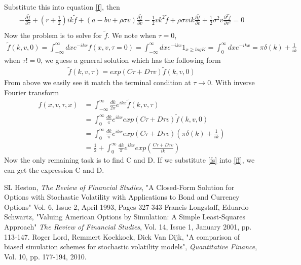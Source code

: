 \documentclass[a4paper]{article}
\begin{document}
Substitute this into equation \ref{f}, then
\begin{align} \label{ff}
	-\frac{\partial \tilde f}{\partial \tau}
	+ (r + \frac{1}{2})ik \tilde f 
	+ (a-bv+\rho \sigma v)\frac{\partial \tilde f}{\partial v}
        -\frac{1}{2}vk^2 \tilde f 
	+ \rho \sigma v ik \frac{\partial \tilde f}{\partial v}
        +\frac{1}{2} \sigma^2 v \frac{\partial^2 \tilde f}{\partial v^2}  = 0\\
\end{align}
Now the problem is to solve for $\tilde f$. We note when $\tau=0$,
\begin{align*}
	\tilde f(k, v, 0) = \int_{-\infty}^{\infty}dx e^{-ikx}f(x, v, \tau=0)
			  = \int_{-\infty}^{\infty}dx e^{-ikx}1_{x \geq logK}
			     = \int_{0}^{\infty}dx e^{-ikx}
			     = \pi \delta(k) + \frac{1}{ik}
\end{align*}
when $\tau!=0$, we guess a general solution which has the following form
\begin{align*}
	\tilde f(k, v, \tau) = exp(C\tau +D\tau v) \tilde f(k,v,0)
\end{align*}
From above we easily see it match the terminal condition at $\tau \to 0$. With inverse Fourier transform
\begin{align} \label{fs}
	f(x, v, \tau, x) & = \int_{-\infty}^{\infty}\frac{dk}{2\pi} e^{ikx} \tilde f(k, v, \tau)\\
			 & = \int_{0}^{\infty}\frac{dk}{\pi} e^{ikx} exp(C\tau + D\tau v) \tilde f(k, v, 0)\\
			 & = \int_{0}^{\infty}\frac{dk}{\pi} e^{ikx} exp(C\tau + D\tau v) 
			 	(\pi \delta(k) + \frac{1}{ik}) \\
			 & = \frac{1}{2} + \int_{0}^{\infty}\frac{dk}{\pi} e^{ikx} exp(\frac{C\tau + D\tau v}{ik}) 
\end{align}
Now the only remaining task is to find C and D. If we substitute \ref{fs} into \ref{ff}, we can get the expression C and D. 
\begin{thebibliography}{9}
		SL Heston,
		\textit{The Review of Financial Studies},
		"A Closed-Form Solution for Options with Stochastic Volatility with Applications 
		to Bond and Currency Options"
		Vol. 6, Issue 2, April 1993, Pages 327-343
		Francis Longstaff, Eduardo Schwartz, 
		"Valuing American Options by Simulation: A Simple Least-Squares Approach"
		\textit{The Review of Financial Studies}, 
		Vol. 14, Issue 1, January 2001, pp. 113-147.
		Roger Lord, Remmert Koekkoek, Dick Van Dijk, 
		"A comparison of biased simulation schemes for stochastic volatility models", 
		\textit{Quantitative Finance}, 
		Vol. 10, pp. 177-194, 2010.
\end{thebibliography}
\end{document}
